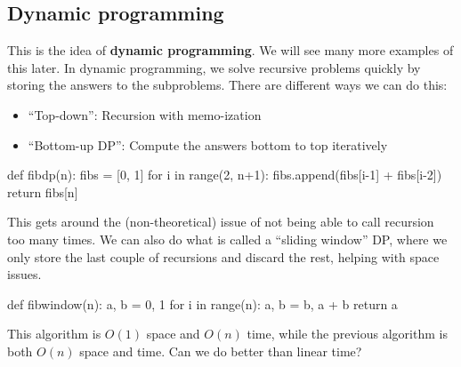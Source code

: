 \subsection{Dynamic programming}
This is the idea of \textbf{dynamic programming}. We will see many more examples of this later. In dynamic programming, we solve recursive problems quickly by storing the answers to the subproblems. There are different ways we can do this:
\begin{itemize}
\setlength\itemsep{-.2em}
    \item ``Top-down'': Recursion with memo-ization
    \item ``Bottom-up DP'': Compute the answers bottom to top iteratively
\end{itemize}
\begin{python}
    def fibdp(n):
    fibs = [0, 1]
    for i in range(2, n+1):
        fibs.append(fibs[i-1] + fibs[i-2])
    return fibs[n]
\end{python}
This gets around the (non-theoretical) issue of not being able to call recursion too many times. We can also do what is called a ``sliding window'' DP, where we only store the last couple of recursions and discard the rest, helping with space issues.
\begin{python}
    def fibwindow(n):
    a, b = 0, 1
    for i in range(n):
        a, b = b, a + b
    return a
\end{python}
This algorithm is $O(1)$ space and $O(n)$ time, while the previous algorithm is both $O(n)$ space and time. Can we do better than linear time?
